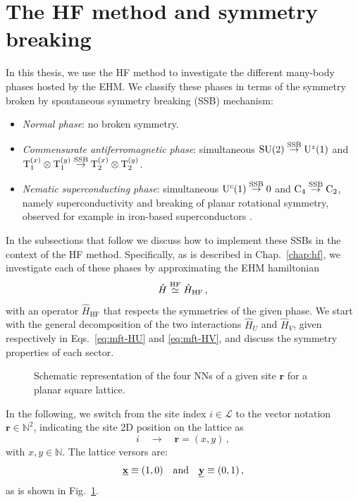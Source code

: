 \section{The HF method and symmetry breaking}\label{sec:ehm-sym-break}

In this thesis, we use the HF method to investigate the different many-body phases hosted by the EHM. We classify these phases in terms of the symmetry broken by spontaneous symmetry breaking (SSB) mechanism:
\begin{itemize}
	\item \textit{Normal phase}: no broken symmetry.
	\item \textit{Commensurate antiferromagnetic phase}: simultaneous $\mathrm{SU}(2) \stackrel{\mathrm{SSB}}{\to} \mathrm{U}^z(1)$ and $\mathrm{T}_1^{(x)} \otimes \mathrm{T}_1^{(y)} \stackrel{\mathrm{SSB}}{\to} \mathrm{T}_2^{(x)} \otimes \mathrm{T}_2^{(y)}$.
	\item \textit{Nematic superconducting phase}: simultaneous $\mathrm{U}^c(1) \stackrel{\mathrm{SSB}}{\to} 0$ and $\mathrm{C}_4 \stackrel{\mathrm{SSB}}{\to} \mathrm{C}_2$, namely superconductivity and breaking of planar rotational symmetry, observed for example in iron-based superconductors \cite{bohmer2022nematicity}.
\end{itemize}
In the subsections that follow we discuss how to implement these SSBs in the context of the HF method. Specifically, as is described in Chap.~\ref{chap:hf}, we investigate each of these phases by approximating the EHM hamiltonian 
\[
	\hat H \stackrel{\mathrm{HF}}{\simeq} \hat H_\mathrm{HF} \, ,
\]
with an operator $\hat H_\mathrm{HF}$ that respects the symmetries of the given phase. We start with the general decomposition of the two interactions $\hat H_U$ and $\hat H_V$, given respectively in Eqs.~\eqref{eq:mft-HU} and \eqref{eq:mft-HV}, and discuss the symmetry properties of each sector.

\begin{figure}
	\centering
	
	\caption{Schematic representation of the four NNs of a given site $\mathbf{r}$ for a planar square lattice.}
	\label{fig:square-nearest-neighbors}
\end{figure}

In the following, we switch from the site index $i \in \mathcal{L}$ to the vector notation $\mathbf{r} \in \mathbb{N}^2$, indicating the site 2D position on the lattice as
\[
	i \quad\to\quad \mathbf{r} = (x,y) \, ,
\]
with $x,y \in \mathbb{N}$. The lattice versors are:
\[
	\underline{\mathbf{x}} \equiv (1,0)
	\qq{and}
	\underline{\mathbf{y}} \equiv (0,1) \, ,
\]
as is shown in Fig.~\ref{fig:square-nearest-neighbors}.

